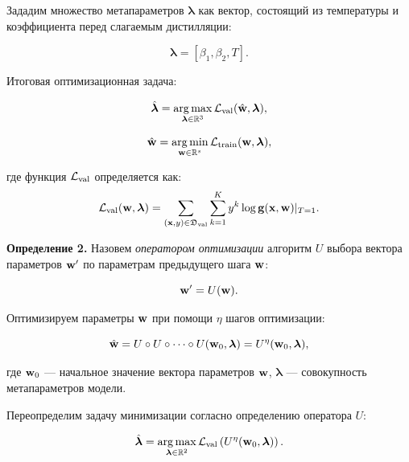 \documentclass[12pt, twoside]{article}
\begin{document}
Зададим множество метапараметров $\boldsymbol{\lambda}$ как вектор, состоящий из температуры и коэффициента перед слагаемым дистилляции:

\[\boldsymbol{\lambda} = [\beta_1, \beta_2, T].\]

Итоговая оптимизационная задача:

\begin{equation} \label{eq:opt_hyp}
    \hat{\boldsymbol{\lambda}} = \argmax\limits_{\boldsymbol{\lambda} \in \bbR^3} \cL_\text{val}(\hat{\bw}, \boldsymbol{\lambda}),
\end{equation}

\begin{equation} \label{eq:opt_param}
    \hat{\bw} = \argmin\limits_{\bw \in \bbR^s} \cL_\text{train}(\bw, \boldsymbol{\lambda}),
\end{equation}

\noindent
где функция $\mathcal{L}_\text{val}$ определяется как: 
 \begin{equation} \label{eq:l_val}
     \cL_\text{val}(\bw, \boldsymbol{\lambda}) = \sum\limits_{(\bx, y) \in \fD_\text{val}}\sum\limits_{k=1}^{K}y^k\log \bg(\bx, \bw)|_{T=1}.
 \end{equation}

\textbf{Определение 2.} Назовем \emph{оператором оптимизации} алгоритм $U$ выбора вектора параметров $\mathbf{w}^\prime$ по параметрам предыдущего шага $\mathbf{w}$:

\begin{equation*}
    \mathbf{w}^\prime = U(\mathbf{w}).
\end{equation*}

Оптимизируем параметры $\mathbf{w}$ при помощи $\eta$ шагов оптимизации:

\begin{equation} \label{eq:oper_superp}
    \hat{\bw} = U \circ U \circ \dots \circ U(\bw_0, \boldsymbol{\lambda}) = U^\eta(\bw_0, \boldsymbol{\lambda}),
\end{equation}

\noindent
где $\mathbf{w}_0$ --- начальное значение вектора параметров $\mathbf{w}$, $\boldsymbol{\lambda}$ --- совокупность метапараметров модели.

Переопределим задачу минимизации согласно определению оператора $U$:

\begin{equation} \label{eq:hyp_oper}
    \hat{\boldsymbol{\lambda}} = \argmax\limits_{\boldsymbol{\lambda} \in \bbR^2} \cL_\text{val}\left(U^\eta(\bw_0, \boldsymbol{\lambda})\right).
\end{equation}
\end{document}

